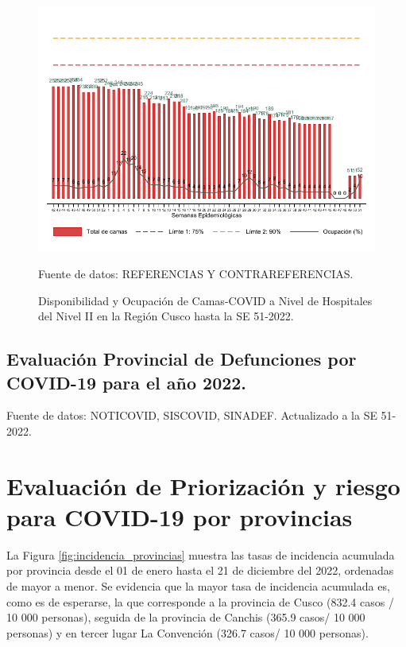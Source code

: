 \documentclass[12pt,a4paper,openany]{book}
\begin{document}
	\begin{figure}[h]
		\caption{Disponibilidad y Ocupación de Camas-COVID a Nivel de Hospitales del Nivel II en la Región Cusco hasta la SE 51-2022.}\label{fig:ocupacion_2nivel}
		\begin{center}
			\includegraphics[width=0.95\linewidth]{../figuras/nivel_2.pdf}
		\end{center}
		{\footnotesize {Fuente de datos: REFERENCIAS Y CONTRAREFERENCIAS.}}
	\end{figure}
	\clearpage
	\begin{landscape}
		
		\subsection*{Evaluación Provincial de Defunciones por COVID-19 para el año 2022.} 
		
		
		
		
		{\footnotesize Fuente de datos: NOTICOVID, SISCOVID, SINADEF. Actualizado a la SE 51-2022.}
		
		\noindent 
		
	\end{landscape}
	
	
	\clearpage
	
	\section*{Evaluación de Priorización y riesgo para COVID-19 por provincias}
	\noindent La Figura \ref{fig:incidencia_provincias} muestra las tasas de incidencia acumulada por provincia desde el 01 de enero hasta el 21 de diciembre del 2022, ordenadas de mayor a menor. Se evidencia que la mayor tasa de incidencia acumulada es, como es de esperarse, la que corresponde a la provincia de Cusco (832.4 casos / 10 000 personas), seguida de la provincia de Canchis (365.9 casos/ 10 000 personas) y en tercer lugar La Convención (326.7 casos/ 10 000 personas).
	
\end{document}
